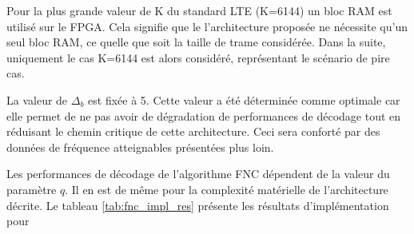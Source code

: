 Pour la plus grande valeur de K du standard LTE (K=6144) un bloc RAM est utilisé sur le FPGA. Cela signifie que le 
l'architecture proposée ne nécessite qu'un seul bloc RAM, ce quelle que soit la taille de trame considérée. Dans la 
suite, uniquement le cas K=6144 est alors considéré, représentant le scénario de pire cas.

La valeur de $\Delta_b$ est fixée à 5. Cette valeur a été déterminée comme optimale car elle permet de ne pas avoir de 
dégradation de performances de décodage tout en réduisant le chemin critique de cette architecture. Ceci sera conforté
par des données de fréquence atteignables présentées plus loin.

Les performances de décodage de l'algorithme FNC dépendent de la valeur du paramètre $q$. Il en est de même pour la
complexité matérielle de l'architecture décrite. Le tableau \ref{tab:fnc_impl_res} présente les résultats d'implémentation pour 